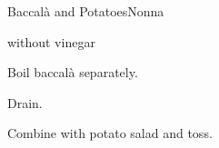 \begin{recipe}{Baccalà and Potatoes}{Nonna}{}

\begin{ingredients}
\item {}
\item {}  without vinegar
\end{ingredients}

\begin{directions}
\item Boil baccalà separately.
\item Drain.
\item Combine with potato salad and toss.
\end{directions}

\end{recipe}

